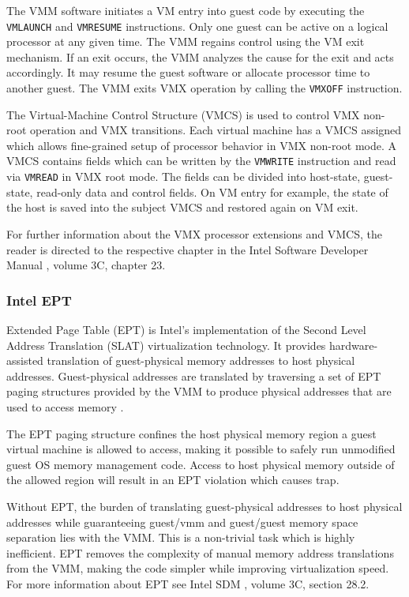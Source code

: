 The VMM software initiates a VM entry into guest code by executing the
\texttt{VMLAUNCH} and \texttt{VMRESUME} instructions. Only one guest can be
active on a logical processor at any given time. The VMM regains control using
the VM exit mechanism. If an exit occurs, the VMM analyzes the cause for the
exit and acts accordingly. It may resume the guest software or allocate
processor time to another guest. The VMM exits VMX operation by calling the
\texttt{VMXOFF} instruction.

The Virtual-Machine Control Structure (VMCS) is used to control VMX
non-root operation and VMX transitions. Each virtual machine has a VMCS assigned
which allows fine-grained setup of processor behavior in VMX non-root mode. A
VMCS contains fields which can be written by the \texttt{VMWRITE}
instruction and read via \texttt{VMREAD} in VMX root mode. The
fields can be divided into host-state, guest-state, read-only data and control
fields. On VM entry for example, the state of the host is saved into the subject
VMCS and restored again on VM exit.

For further information about the VMX processor extensions and VMCS, the reader
is directed to the respective chapter in the Intel Software Developer
Manual \cite{IntelSDM}, volume 3C, chapter 23.

\subsubsection{Intel EPT}\label{subsubsec:ept}
Extended Page Table (EPT) is Intel's implementation of the Second
Level Address Translation (SLAT) virtualization technology. It
provides hardware-assisted translation of guest-physical memory addresses to
host physical addresses. Guest-physical addresses are translated by traversing a
set of EPT paging structures provided by the VMM to produce physical addresses
that are used to access memory \cite{IntelSDM}.

The EPT paging structure confines the host physical memory region a guest
virtual machine is allowed to access, making it possible to safely run
unmodified guest OS memory management code. Access to host physical memory
outside of the allowed region will result in an EPT violation which causes trap.

Without EPT, the burden of translating guest-physical addresses to host physical
addresses while guaranteeing guest/vmm and guest/guest memory space separation
lies with the VMM. This is a non-trivial task which is highly inefficient. EPT
removes the complexity of manual memory address translations from the VMM,
making the code simpler while improving virtualization speed. For more
information about EPT see Intel SDM \cite{IntelSDM}, volume 3C, section 28.2.

